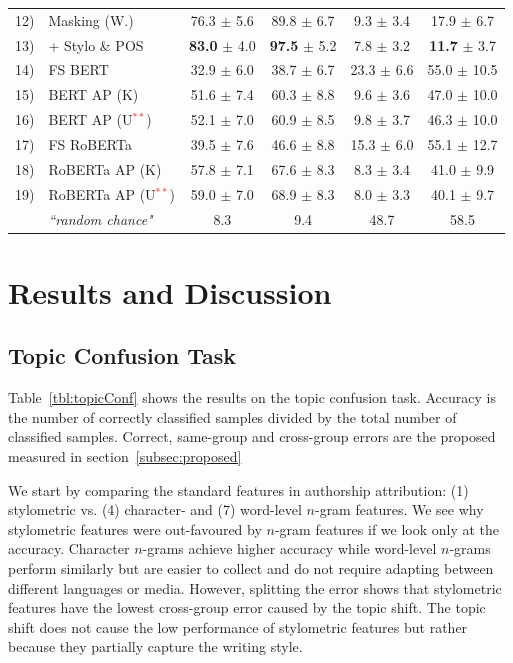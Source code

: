 \documentclass[11pt]{article}
\begin{document}
\begin{table}[htb]
\begin{tabular}{l|l|c|ccc}
12) & Masking (W.)  & 76.3 $\pm$ 5.6 & 89.8 $\pm$ 6.7 & 9.3 $\pm$ 3.4 & 17.9 $\pm$ 6.7 \\
13) & \phantom{hi}+ Stylo \& POS & \textbf{83.0} $\pm$ 4.0 & \textbf{97.5} $\pm$ 5.2 & 7.8 $\pm$ 3.2 & \textbf{11.7} $\pm$ 3.7 \\

\hline \hline
14) & FS BERT   & 32.9 $\pm$ 6.0  & 38.7 $\pm$ 6.7 & 23.3  $\pm$ 6.6 & 55.0  $\pm$ 10.5 \\
15) & BERT AP (K) & 51.6 $\pm$ 7.4 & 60.3 $\pm$ 8.8 & 9.6 $\pm$ 3.6 & 47.0 $\pm$ 10.0\\
16) & BERT AP (U\textcolor{red}{$^{**}$}) & 52.1 $\pm$ 7.0 & 60.9 $\pm$ 8.5 & 9.8 $\pm$ 3.7 & 46.3 $\pm$ 10.0\\

\hline
17) & FS RoBERTa & 39.5 $\pm$ 7.6 & 46.6 $\pm$ 8.8 & 15.3 $\pm$ 6.0 & 55.1 $\pm$ 12.7 \\
18) & RoBERTa AP (K) & 57.8 $\pm$ 7.1 & 67.6 $\pm$ 8.3 & 8.3 $\pm$ 3.4 & 41.0 $\pm$ 9.9\\
19) & RoBERTa AP (U\textcolor{red}{$^{**}$}) & 59.0 $\pm$ 7.0 & 68.9 $\pm$ 8.3 & 8.0 $\pm$ 3.3 & 40.1 $\pm$ 9.7\\

\hline\hline
& \multirow{1}{*}{\textit{``random chance"}} & 8.3 & 9.4 & 48.7 & 58.5 \\\hline
\end{tabular}

\end{table}

\section{Results and Discussion}
\subsection{Topic Confusion Task}
Table~\ref{tbl:topicConf} shows the results on the topic confusion task. Accuracy is the number of correctly classified samples divided by the total number of classified samples. Correct, same-group and cross-group errors are the proposed measured in section~\ref{subsec:proposed} 

We start by comparing the standard features in authorship attribution: (1) stylometric vs. (4) character- and (7) word-level $n$-gram features. We see why stylometric features were out-favoured by $n$-gram features if we look only at the accuracy. Character $n$-grams achieve higher accuracy while word-level $n$-grams perform similarly but are easier to collect and do not require adapting between different languages or media. However, splitting the error shows that stylometric features have the lowest cross-group error caused by the topic shift. The topic shift does not cause the low performance of stylometric features but rather because they partially capture the writing style.
\end{document}
